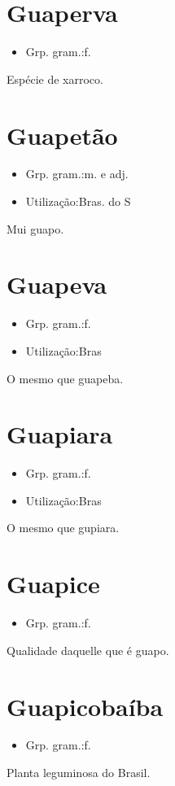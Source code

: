 \section{Guaperva}
\begin{itemize}
\item {Grp. gram.:f.}
\end{itemize}
Espécie de xarroco.
\section{Guapetão}
\begin{itemize}
\item {Grp. gram.:m.  e  adj.}
\end{itemize}
\begin{itemize}
\item {Utilização:Bras. do S}
\end{itemize}
Mui guapo.
\section{Guapeva}
\begin{itemize}
\item {Grp. gram.:f.}
\end{itemize}
\begin{itemize}
\item {Utilização:Bras}
\end{itemize}
O mesmo que \textunderscore guapeba\textunderscore .
\section{Guapiara}
\begin{itemize}
\item {Grp. gram.:f.}
\end{itemize}
\begin{itemize}
\item {Utilização:Bras}
\end{itemize}
O mesmo que \textunderscore gupiara\textunderscore .
\section{Guapice}
\begin{itemize}
\item {Grp. gram.:f.}
\end{itemize}
Qualidade daquelle que é guapo.
\section{Guapicobaíba}
\begin{itemize}
\item {Grp. gram.:f.}
\end{itemize}
Planta leguminosa do Brasil.
